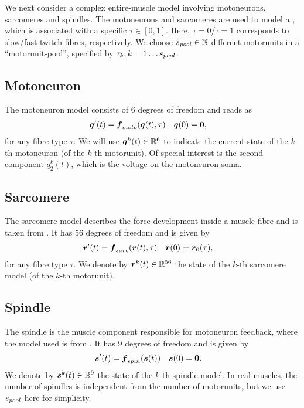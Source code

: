 We next consider a complex entire-muscle model involving motoneurons, sarcomeres and spindles.
The motoneurons and sarcomeres are used to model a , which is associated with a specific  $\tau\in[0,1]$.
Here, $\tau=0$/$\tau=1$ corresponds to slow/fast twitch fibres, respectively.
We choose ${s_{pool}}\in \mathbb{N}$ different motorunits in a ``motorunit-pool'', specified by $\tau_k,k=1\ldots{s_{pool}}$.

\subsection{Motoneuron}
The motoneuron model consists of $6$ degrees of freedom and reads as
\begin{align}
	\boldsymbol{q}'(t) &= \boldsymbol{f}_{moto}(\boldsymbol{q}(t),\tau) & \boldsymbol{q}(0) &= \boldsymbol{0},
\end{align}
for any fibre type $\tau$.
We will use $\boldsymbol{q}^k(t) \in \mathbb{R}^6$ to indicate the current state of the $k$-th motoneuron (of the $k$-th motorunit).
Of special interest is the second component $q^k_2(t)$, which is the voltage on the motoneuron soma.


\subsection{Sarcomere}
The sarcomere model describes the force development inside a muscle fibre and is taken from \cite{Shorten2007}.
It has $56$ degrees of freedom and is given by
\begin{align}
	\boldsymbol{r}'(t) &= \boldsymbol{f}_{sarc}(\boldsymbol{r}(t),\tau) & \boldsymbol{r}(0) &= \boldsymbol{r}_0(\tau),
\end{align}
for any fibre type $\tau$.
We denote by $\boldsymbol{r}^k(t)\in\mathbb{R}^{56}$ the state of the $k$-th sarcomere model (of the $k$-th motorunit).

\subsection{Spindle}
The spindle is the muscle component responsible for motoneuron feedback, where the model used is from \cite{Mileusnic2006}.
It has $9$ degrees of freedom and is given by
\begin{align}
	\boldsymbol{s}'(t) &= \boldsymbol{f}_{spin}(\boldsymbol{s}(t)) & \boldsymbol{s}(0) &= \boldsymbol{0}.
\end{align}
We denote by $\boldsymbol{s}^k(t)\in\mathbb{R}^9$ the state of the $k$-th spindle model. In real muscles, the number of spindles is independent from the
number of motorunits, but we use ${s_{pool}}$ here for simplicity.

